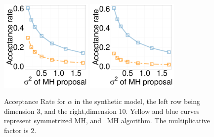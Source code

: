   \begin{figure}[H]
  \centering

  \begin{minipage}[!hp]{0.99\linewidth}
    \includegraphics [width=0.40\textwidth, angle=0]{figs/acc/Q_D3alpha_k2.pdf}
	\hspace{.5in}
    \includegraphics [width=0.40\textwidth, angle=0]{figs/acc/Q_D10alpha_k2.pdf}
  \end{minipage}
    \caption{Acceptance Rate for $\alpha$ in the synthetic model, the left row being dimension 3, and the right,dimension 10.  Yellow and blue curves represent symmetrized MH,
 and \naive\ MH  algorithm. The multiplicative factor is $2$. }
     \label{fig:ACC_Q}
  \end{figure}


